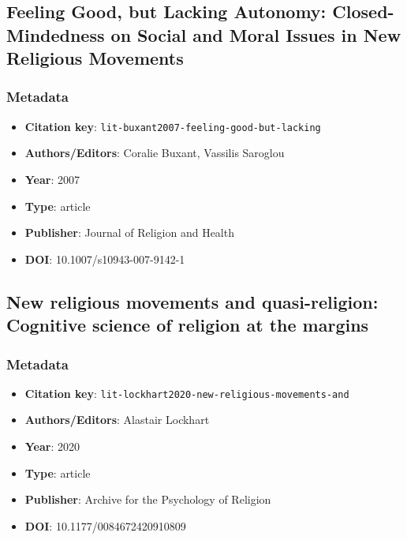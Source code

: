 \subsection{Feeling Good, but Lacking Autonomy: Closed-Mindedness on Social and Moral Issues in New Religious Movements}\label{lit:lit-buxant2007-feeling-good-but-lacking}
\subsubsection*{Metadata}
\begin{itemize}
  \item \textbf{Citation key}: \texttt{lit-buxant2007-feeling-good-but-lacking}
  \item \textbf{Authors/Editors}: Coralie Buxant, Vassilis Saroglou
  \item \textbf{Year}: 2007
  \item \textbf{Type}: article
  \item \textbf{Publisher}: Journal of Religion and Health
  \item \textbf{DOI}: 10.1007/s10943-007-9142-1
\end{itemize}

\subsection{New religious movements and quasi-religion: Cognitive science of religion at the margins}\label{lit:lit-lockhart2020-new-religious-movements-and}
\subsubsection*{Metadata}
\begin{itemize}
  \item \textbf{Citation key}: \texttt{lit-lockhart2020-new-religious-movements-and}
  \item \textbf{Authors/Editors}: Alastair Lockhart
  \item \textbf{Year}: 2020
  \item \textbf{Type}: article
  \item \textbf{Publisher}: Archive for the Psychology of Religion
  \item \textbf{DOI}: 10.1177/0084672420910809
\end{itemize}
